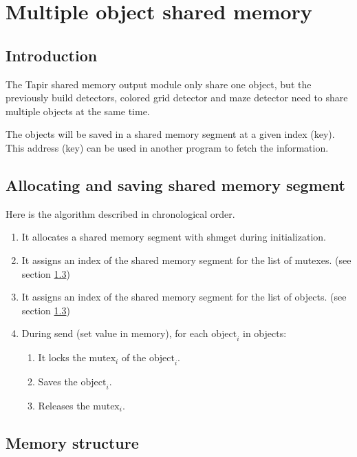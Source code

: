 \section{Multiple object shared memory}
\label{sec:mosm}

\subsection{Introduction}
\label{sec:mosm:intro}

The Tapir shared memory output module only share one object, but the 
previously build detectors, colored grid detector and maze detector 
need to share multiple objects at the same time. 

The objects will be saved in a shared memory segment at a given index 
(key). This address (key) can be used in another program to fetch the 
information.

\subsection{Allocating and saving shared memory segment}
\label{sec:mosm:algo}
Here is the algorithm described in chronological order.

    \begin{enumerate}
        \item It allocates a shared memory segment with shmget during 
            initialization.
        \item It assigns an index of the shared memory segment for the list 
            of mutexes. (see section \ref{sec:mosm:ms})
        \item It assigns an index of the shared memory segment for the list 
            of objects. (see section \ref{sec:mosm:ms})
        \item During send (set value in memory), for each $\mbox{object}_i$ in objects:
        \begin{enumerate}
            \item It locks the $\mbox{mutex}_i$ of the $\mbox{object}_i$.
            \item Saves the $\mbox{object}_i$.
            \item Releases the $\mbox{mutex}_i$.
        \end{enumerate}
    \end{enumerate}

\subsection{Memory structure}
\label{sec:mosm:ms}

